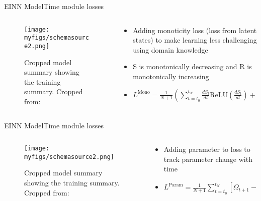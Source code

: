 \documentclass[
	aspectratio=169,	%
	onlytextwidth,		%
	t,					%
	]{beamer}
\begin{document}
\begin{frame}[fragile]{EINN Model}{Time module losses}
	\begin{columns}
		
		\begin{column}[T]{.5\textwidth}
			\begin{figure}
				\texttt{[image: myfigs/schemasource2.png]}
				\caption{Cropped model summary showing the training summary. Cropped from:~\cite{main}}
			\end{figure}
		\end{column}
		
		\begin{column}[T]{.5\textwidth}
			\begin{itemize}
				\item<1-> Adding monoticity loss (loss from latent states) to make learning less challenging using domain knowledge~\cite{murat,main}
				\item <2-> S is monotonically decreasing and R is monotonically increasing~\cite{main}
				\item<2->	$L^{\text{Mono}} = \frac{1}{N+1} (\sum_{t=t_{0}}^{t_{N}} \frac{dS_{t}}{dt}\text{ReLU} (\frac{dS_{t}}{dt}) + \sum_{t=t_{0}}^{t_{N}} -1\frac{dR_{t}}{dt}\text{ReLU} (-\frac{dR_{t}}{dt}))$
			\end{itemize}
		\end{column}
			
\end{columns}
\end{frame}

\begin{frame}[fragile]{EINN Model}{Time module losses}
	\begin{columns}
		
		\begin{column}[T]{.5\textwidth}
			\begin{figure}
				\texttt{[image: myfigs/schemasource2.png]}
				\caption{Cropped model summary showing the training summary. Cropped from:~\cite{main}}
			\end{figure}
		\end{column}
		
		\begin{column}[T]{.5\textwidth}
			\begin{itemize}
				\item<1-> Adding parameter to loss to track parameter change with time
				\item<2-> $L^{\text{Param}} = \frac{1}{N+1} \sum_{t=t_{0}}^{t_{N}} \left[ \Omega_{t+1} - \Omega_{t} \right]^{2} $
			\end{itemize}
		\end{column}
			
\end{columns}
\end{frame}
\end{document}
